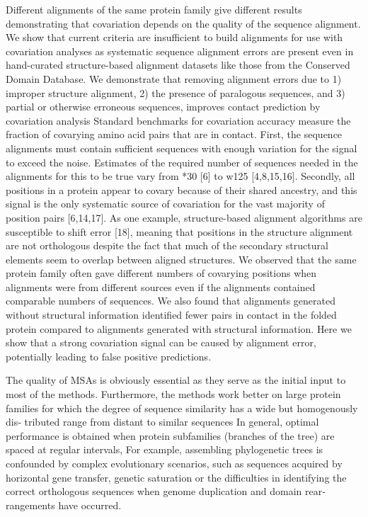 Different alignments of the same protein family give different results demonstrating that covariation depends on the quality of the sequence alignment. \cite{dickson2010identifying}
We show that current criteria are insufficient to build alignments for use with covariation analyses as systematic sequence alignment errors are present even in hand-curated structure-based alignment datasets like those from the Conserved Domain Database.  \cite{dickson2010identifying}
We demonstrate that removing alignment errors due to 1) improper structure alignment, 2) the presence of paralogous sequences, and 3) partial or otherwise erroneous sequences, improves contact prediction by covariation analysis \cite{dickson2010identifying}
Standard benchmarks for covariation accuracy measure the fraction of covarying amino acid pairs that are in contact.  \cite{dickson2010identifying}
First, the sequence alignments must contain sufficient sequences with enough variation for the signal to exceed the noise. Estimates of the required number of sequences needed in the alignments for this to be true vary from *30 [6] to w125 [4,8,15,16].  \cite{dickson2010identifying}
Secondly, all positions in a protein appear to covary because of their shared ancestry, and this signal is the only systematic source of covariation for the vast majority of position pairs [6,14,17].  \cite{dickson2010identifying}
As one example, structure-based alignment algorithms are susceptible to shift error [18], meaning that positions in the structure alignment are not orthologous despite the fact that much of the secondary structural elements seem to overlap between aligned structures. \cite{dickson2010identifying}
We observed that the same protein family often gave different numbers of covarying positions when alignments were from different sources even if the alignments contained comparable numbers of sequences.  \cite{dickson2010identifying}
We also found that alignments generated without structural information identified fewer pairs in contact in the folded protein compared to alignments generated with structural information. \cite{dickson2010identifying}
Here we show that a strong covariation signal can be caused by alignment error, potentially leading to false positive predictions.  \cite{dickson2010identifying}

	The quality of MSAs is obviously essential as they serve as the initial input to most of the methods. Furthermore, the methods work better on large protein families for which the degree of sequence similarity has a wide but homogenously dis‐ tributed range from distant to similar sequences \cite{de2013emerging}
	In general, optimal performance is obtained when protein subfamilies (branches of the tree) are spaced at regular intervals, \cite{de2013emerging}
	For example, assembling phylogenetic trees is confounded by complex evolutionary scenarios, such as sequences acquired by horizontal gene transfer, genetic saturation or the difficulties in identifying the correct orthologous sequences when genome duplication and domain rear‐ rangements have occurred. \cite{de2013emerging}


